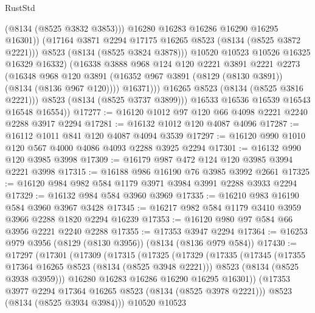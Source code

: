 \begin{lexlean}{RustStd}
\begin{coremodule}
{\begin{coremodule}
{{{{{{{{{{{{{{{{{{{{{{{{{{{{{{{{{{{{{{{{{{{{{{{{{{{{{                          (@8134 (@8525 @3832 @3853)))
                        @16280
                        @16283
                        @16286
                        @16290
                        @16295
                        @16301))
                    (@17164 @3871 @2294 @17175 @16265 @8523 (@8134 (@8525 @3872 @2221)))
                    @8523
                    (@8134 (@8525 @3824 @3878)))
                  @10520
                  @10523
                  @10526
                  @16325
                  @16329
                  @16332)
                (@16338
                  @3888
                  @968
                  @124
                  @120
                  @2221
                  @3891
                  @2221
                  @2273
                  (@16348
                    @968
                    @120
                    @3891
                    (@16352 @967 @3891 (@8129 (@8130 @3891)) (@8134 (@8136 @967 @120))))
                  @16371)))
            @16265
            @8523
            (@8134 (@8525 @3816 @2221)))
          @8523
          (@8134 (@8525 @3737 @3899)))
        @16533
        @16536
        @16539
        @16543
        @16548
        @16554))
@17277 := @16120 @1012 @97 @120 @66 @4098 @2221 @2240 @2288 @3917 @2294
@17281 := @16132 @1012 @120 @4087 @4096
@17287 := @16112 @1011 @841 @120 @4087 @4094 @3539
@17297 := @16120 @990 @1010 @120 @567 @4000 @4086 @4093 @2288 @3925 @2294
@17301 := @16132 @990 @120 @3985 @3998
@17309 := @16179 @987 @472 @124 @120 @3985 @3994 @2221 @3998
@17315 := @16188 @986 @16190 @76 @3985 @3992 @2661
@17325 := @16120 @984 @982 @584 @1179 @3971 @3984 @3991 @2288 @3933 @2294
@17329 := @16132 @984 @584 @3960 @3969
@17335 := @16210 @983 @16190 @584 @3960 @3967 @3428
@17345 := @16217 @982 @584 @1179 @3410 @3959 @3966 @2288 @1820 @2294 @16239
@17353 := @16120 @980 @97 @584 @66 @3956 @2221 @2240 @2288
@17355 := @17353 @3947 @2294
@17364 := @16253 @979 @3956 (@8129 (@8130 @3956)) (@8134 (@8136 @979 @584))
@17430 := @17297
    (@17301
      (@17309
        (@17315
          (@17325
            (@17329
              (@17335
                (@17345
                  (@17355 @17364 @16265 @8523 (@8134 (@8525 @3948 @2221)))
                  @8523
                  (@8134 (@8525 @3938 @3959)))
                @16280
                @16283
                @16286
                @16290
                @16295
                @16301))
            (@17353 @3977 @2294 @17364 @16265 @8523 (@8134 (@8525 @3978 @2221)))
            @8523
            (@8134 (@8525 @3934 @3984)))
          @10520
          @10523
}}}}}}}}}}}}}}}}}}}}}}}}}}}}}}}}}}}}}}}}}}}}}}}}}}}}}
\end{coremodule}}
\end{coremodule}
\end{lexlean}
